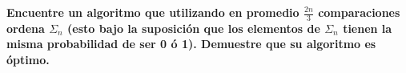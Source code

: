 \textbf{Encuentre un algoritmo que utilizando en promedio $\frac{2n}{3}$ comparaciones ordena $\Sigma_n$ (esto bajo la suposición que los elementos de $\Sigma_n$ tienen la misma probabilidad de ser 0 ó 1). Demuestre que su algoritmo es óptimo.}\vspace{.2cm}

\textcolor{bibi}{}
\begin{quote}
\end{quote}